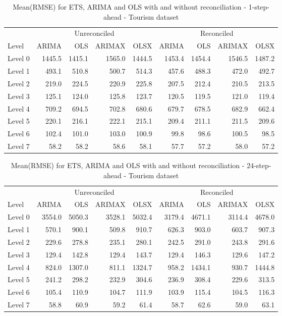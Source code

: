 \documentclass[11pt,a4paper,]{article}
\begin{document}
\begin{table}[t]

\caption{\label{tab:easterroolingRMSE}Mean(RMSE) for ETS, ARIMA and OLS with and without reconciliation - 1-step-ahead - Tourism dataset}
\centering
\begin{tabular}{lrrrrrrrr}
\toprule
\multicolumn{1}{c}{} & \multicolumn{4}{c}{Unreconciled} & \multicolumn{4}{c}{Reconciled} \\
\cmidrule(l{3pt}r{3pt}){2-5} \cmidrule(l{3pt}r{3pt}){6-9}
Level & ARIMA & OLS & ARIMAX & OLSX & ARIMA & OLS & ARIMAX & OLSX\\
\midrule
Level 0 & 1445.5 & 1415.1 & 1565.0 & 1444.5 & 1453.4 & 1454.4 & 1546.5 & 1487.2\\
Level 1 & 493.1 & 510.8 & 500.7 & 514.3 & 457.6 & 488.3 & 472.0 & 492.7\\
Level 2 & 219.0 & 224.5 & 220.9 & 225.8 & 207.5 & 212.4 & 210.5 & 213.5\\
Level 3 & 125.1 & 124.0 & 125.8 & 123.7 & 120.5 & 119.5 & 121.0 & 119.4\\
Level 4 & 709.2 & 694.5 & 702.8 & 680.6 & 679.7 & 678.5 & 682.9 & 662.4\\
Level 5 & 220.1 & 216.1 & 222.1 & 215.1 & 209.4 & 211.1 & 211.5 & 209.6\\
Level 6 & 102.4 & 101.0 & 103.0 & 100.9 & 99.8 & 98.6 & 100.5 & 98.5\\
Level 7 & 58.2 & 58.2 & 58.6 & 58.1 & 57.7 & 57.2 & 58.0 & 57.2\\
\bottomrule
\end{tabular}
\end{table}

\begin{table}[t]

\caption{\label{tab:easterRMSE}Mean(RMSE) for ETS, ARIMA and OLS with and without reconciliation - 24-step-ahead - Tourism dataset}
\centering
\begin{tabular}{lrrrrrrrr}
\toprule
\multicolumn{1}{c}{} & \multicolumn{4}{c}{Unreconciled} & \multicolumn{4}{c}{Reconciled} \\
\cmidrule(l{3pt}r{3pt}){2-5} \cmidrule(l{3pt}r{3pt}){6-9}
Level & ARIMA & OLS & ARIMAX & OLSX & ARIMA & OLS & ARIMAX & OLSX\\
\midrule
Level 0 & 3554.0 & 5050.3 & 3528.1 & 5032.4 & 3179.4 & 4671.1 & 3114.4 & 4678.0\\
Level 1 & 570.1 & 900.1 & 509.8 & 910.7 & 626.3 & 903.0 & 603.7 & 907.3\\
Level 2 & 229.6 & 278.8 & 235.1 & 280.1 & 242.5 & 291.0 & 243.8 & 291.6\\
Level 3 & 129.4 & 142.8 & 129.4 & 143.7 & 129.4 & 146.3 & 129.6 & 147.2\\
Level 4 & 824.0 & 1307.0 & 811.1 & 1324.7 & 958.2 & 1434.1 & 930.7 & 1444.8\\
Level 5 & 241.2 & 298.2 & 232.9 & 304.6 & 236.9 & 308.4 & 229.6 & 313.5\\
Level 6 & 105.4 & 110.9 & 104.7 & 111.9 & 103.9 & 115.4 & 104.5 & 116.3\\
Level 7 & 58.8 & 60.9 & 59.2 & 61.4 & 58.7 & 62.6 & 59.0 & 63.1\\
\bottomrule
\end{tabular}
\end{table}
\end{document}
